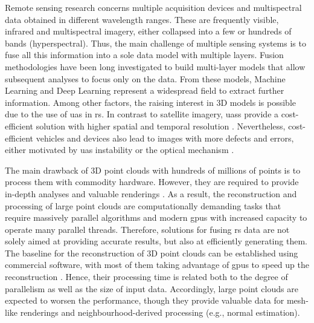 Remote sensing research concerns multiple acquisition devices and multispectral data obtained in different wavelength ranges. These are frequently visible, infrared and multispectral imagery, either collapsed into a few or hundreds of bands (hyperspectral). Thus, the main challenge of multiple sensing systems is to fuse all this information into a sole data model with multiple layers. Fusion methodologies have been long investigated to build multi-layer models that allow subsequent analyses to focus only on the data. From these models, Machine Learning \cite{padua_vineyard_2022} and Deep Learning \cite{jia_survey_2021, hu_hyperspectral_2022} represent a widespread field to extract further information. Among other factors, the raising interest in 3D models is possible due to the use of \acrshort{uas} in \acrshort{rs}. In contrast to satellite imagery, \acrshort{uas}s provide a cost-efficient solution with higher spatial and temporal resolution \cite{singh_bibliometric_2022}. Nevertheless, cost-efficient vehicles and devices also lead to images with more defects and errors, either motivated by \acrshort{uas} instability \cite{akhoundi_khezrabad_new_2022} or the optical mechanism \cite{mohamad_screening_2021, lopez_framework_2021}. 

The main drawback of 3D point clouds with hundreds of millions of points is to process them with commodity hardware. However, they are required to provide in-depth analyses and valuable renderings \cite{schutz_rendering_2021}. As a result, the reconstruction and processing of large point clouds are computationally demanding tasks that require massively parallel algorithms and modern \acrshort{gpu}s with increased capacity to operate many parallel threads. Therefore, solutions for fusing \acrshort{rs} data are not solely aimed at providing accurate results, but also at efficiently generating them. The baseline for the reconstruction of 3D point clouds can be established using commercial software, with most of them taking advantage of \acrshort{gpu}s to speed up the reconstruction \cite{jiang_efficient_2020}. Hence, their processing time is related both to the degree of parallelism as well as the size of input data. Accordingly, large point clouds are expected to worsen the performance, though they provide valuable data for mesh-like renderings and neighbourhood-derived processing (e.g., normal estimation).   

